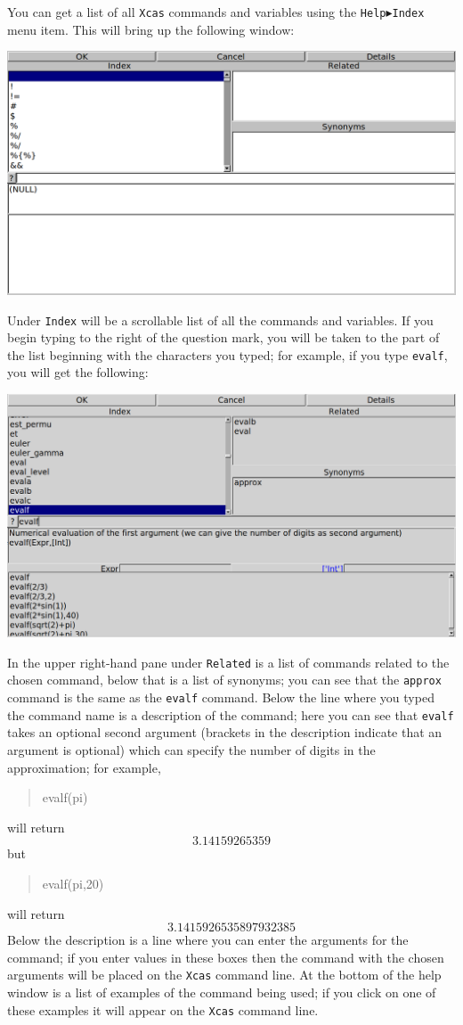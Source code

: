 \documentclass{article}
\newcommand{\xcasin}[1]
{\begin{quote}\ttfamily
#1
\end{quote}}
\newcommand{\xcasout}[1]
{\begin{equation*}
#1
\end{equation*}}
\begin{document}
You can get a list of all \texttt{Xcas} commands and variables using the
\texttt{Help$\blacktriangleright$Index} menu item.
This will bring up the following window:
\begin{center}
\includegraphics[width=\textwidth]{xcas-help-index.png}
\end{center}
Under \texttt{Index} will be a scrollable list of all the commands and
variables.  
If you begin typing to the right of the question mark, you will be
taken to the part of the list beginning with the characters you typed;
for example, if you type \texttt{evalf}, 
you will get the following:
\begin{center}
\includegraphics[width=\textwidth]{xcas-help-evalf.png}
\end{center}
In the upper right-hand pane under \texttt{Related} is a list of
commands related to the chosen command, below that is a list of
synonyms; you can see that the \texttt{approx} command is the same as
the \texttt{evalf} command.  Below the line where you typed the
command name is a description of the command; here you
can see that \texttt{evalf} takes an optional second argument
(brackets in the description indicate that an argument is optional)
which can specify the number of digits in the approximation; for
example, 
\xcasin{evalf(pi)}
will return
\xcasout{3.14159265359}
but 
\xcasin{evalf(pi,20)}
will return
\xcasout{3.1415926535897932385}
Below the description is a line where you can enter the arguments for
the command; if you enter values in these boxes then the command with
the chosen arguments will be placed on the \texttt{Xcas} command line.
At the bottom of the help window is a list of examples of the command
being used; if you click on one of these examples it will appear on
the \texttt{Xcas} command line.
\end{document}
